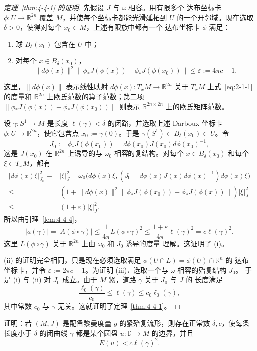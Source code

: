 \begin{proof}[定理~\ref{thm:4-4-1} 的证明]
先假设 $J$ 与 $\omega$ 相容。用有限多个 达布坐标卡
$\phi:U\to\mathbb R^{2n}$ 覆盖 $M$，并使每个坐标卡都能光滑延拓到 $\overline U$
的一个开邻域。现在选取 $\delta>0$，使得对每个 $x_0\in M$，上述有限族中都有一个
达布坐标卡 $\phi$ 满足：
\begin{enumerate}[label=(\roman*),leftmargin=3em]
\item 球 $B_\delta(x_0)$ 包含在 $U$ 中；
\item 对每个 $x\in B_\delta(x_0)$，
\[
  \lVert d\phi(x)\rVert^2
  \bigl\lVert\phi_*J(\phi(x))-\phi_*J(\phi(x_0))\bigr\rVert
  \le\varepsilon:=4\pi c-1.
\]
\end{enumerate}
这里，$\lVert d\phi(x)\rVert$ 表示线性映射
$d\phi(x):T_xM\to\mathbb R^{2n}$ 关于 $T_xM$ 上式~\eqref{eq:2-1-1} 的度量和
$\mathbb R^{2n}$ 上欧氏范数的算子范数；第二项
$\lVert\phi_*J(\phi(x))-\phi_*J(\phi(x_0))\rVert$ 则表示
$\mathbb R^{2n\times2n}$ 上的欧氏矩阵范数。

设 $\gamma:S^1\to M$ 是长度 $\ell(\gamma)<\delta$ 的闭路，并选取上述 Darboux
坐标卡 $\phi:U\to\mathbb R^{2n}$，使它包含点 $x_0:=\gamma(0)$。于是
$\gamma(S^1)\subset B_\delta(x_0)\subset U$。令
\[
  J_0:=\phi_*J(\phi(x_0))
  =d\phi(x_0)J(x_0)d\phi(x_0)^{-1},
\]
这是 $J(x_0)$ 在 $\mathbb R^{2n}$ 上诱导的与 $\omega_0$ 相容的复结构。对每个
$x\in B_\delta(x_0)$ 和每个 $\xi\in T_xM$，都有
\[
  \begin{aligned}
  |d\phi(x)\xi|_{J_0}^2
  ={}&|\xi|_J^2
  +\omega_0\bigl(d\phi(x)\xi,
    (J_0-d\phi(x)J(x)d\phi(x)^{-1})d\phi(x)\xi\bigr)\\
  \le{}&\left(1+\lVert d\phi(x)\rVert^2
    \bigl\lVert\phi_*J(\phi(x_0))-\phi_*J(\phi(x))\bigr\rVert\right)|\xi|_J^2\\
  \le{}&(1+\varepsilon)|\xi|_J^2.
  \end{aligned}
\]
所以由引理~\ref{lem:4-4-4}，
\[
  |a(\gamma)|=|A(\phi\circ\gamma)|
  \le\frac1{4\pi}L(\phi\circ\gamma)^2
  \le\frac{1+\varepsilon}{4\pi}\ell(\gamma)^2
  =c\ell(\gamma)^2.
\]
这里 $L(\phi\circ\gamma)$ 关于 $\mathbb R^{2n}$ 上由 $\omega_0$ 和 $J_0$ 诱导的度量
理解。这证明了 (i)。

(ii) 的证明完全相同，只是现在必须选取满足
$\phi(U\cap L)=\phi(U)\cap\mathbb R^n$ 的 达布坐标卡，并令
$\varepsilon:=2\pi c-1$。为证明 (iii)，选取一个与 $\omega$ 相容的殆复结构 $J_0$。
于是 (i) 与 (ii) 对 $J_0$ 成立。由于 $M$ 紧，道路 $\gamma$ 关于 $J_0$ 与 $J$ 的
长度满足
\[
  \frac{\ell_0(\gamma)}{c_0}
  \le\ell(\gamma)\le c_0\ell_0(\gamma),
\]
其中常数 $c_0$ 与 $\gamma$ 无关。这就证明了定理~\ref{thm:4-4-1}。
\end{proof}

\begin{exercise}\label{ex:4-4-6}
证明：若 $(M,J)$ 是配备黎曼度量 $g$ 的紧殆复流形，则存在正常数 $\delta,c$，使每条
长度小于 $\delta$ 的闭曲线 $\gamma$ 都是某个圆盘 $u:\mathbb D\to M$ 的边界，并且
\[
  E(u)<c\ell(\gamma)^2.
\]
\end{exercise}
